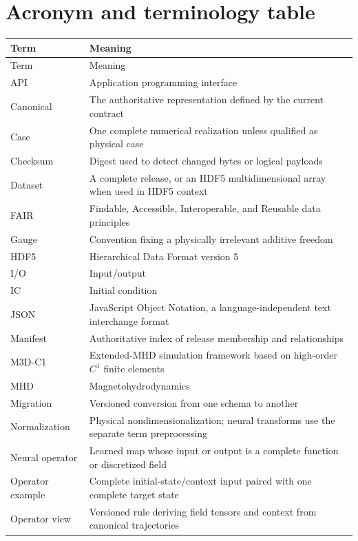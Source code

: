 \documentclass[11pt]{article}
\begin{document}
\section{Acronym and terminology table}
\label{app:acronyms}

\begin{longtable}{p{}p{}}
\toprule
Term & Meaning \\
\midrule
\endfirsthead
\toprule
Term & Meaning \\
\midrule
\endhead
API & Application programming interface \\
Canonical & The authoritative representation defined by the current contract \\
Case & One complete numerical realization unless qualified as physical case \\
Checksum & Digest used to detect changed bytes or logical payloads \\
Dataset & A complete release, or an HDF5 multidimensional array when used in HDF5 context \\
FAIR & Findable, Accessible, Interoperable, and Reusable data principles \\
Gauge & Convention fixing a physically irrelevant additive freedom \\
HDF5 & Hierarchical Data Format version 5 \\
I/O & Input/output \\
IC & Initial condition \\
JSON & JavaScript Object Notation, a language-independent text interchange format \\
Manifest & Authoritative index of release membership and relationships \\
M3D-C1 & Extended-MHD simulation framework based on high-order $C^1$ finite elements \\
MHD & Magnetohydrodynamics \\
Migration & Versioned conversion from one schema to another \\
Normalization & Physical nondimensionalization; neural transforms use the separate term preprocessing \\
Neural operator & Learned map whose input or output is a complete function or discretized field \\
Operator example & Complete initial-state/context input paired with one complete target state \\
Operator view & Versioned rule deriving field tensors and context from canonical trajectories \\

\end{longtable}
\end{document}
